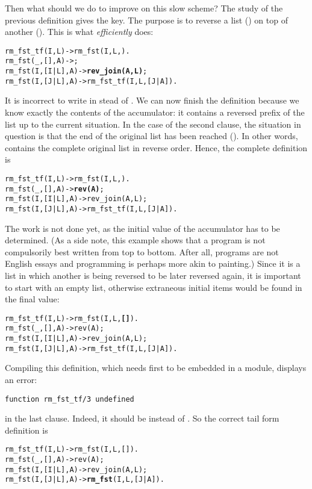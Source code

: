 Then what should we do to improve on this slow scheme? The study of
the previous definition gives the key. The purpose is to reverse a
list () on top of another (). This is what
 \emph{efficiently} does:
\begin{alltt}
rm_fst_tf(I,L)    -> rm_fst(I,L,\fbcode{[]}).
rm_fst(_,   [],A) -> \fbox{[]};
rm_fst(I,[I|L],A) -> \textbf{rev_join(A,L)};
rm_fst(I,[J|L],A) -> rm_fst_tf(I,L,[J|A]).
\end{alltt}
It is incorrect to write  in stead of
. We can now finish the definition because we
know exactly the contents of the accumulator: it contains a reversed
prefix of the list up to the current situation. In the case of the
second clause, the situation in question is that the end of the
original list has been reached (\erlcode{[]}). In other words,
 contains the complete original list in reverse
order. Hence, the complete definition is
\begin{alltt}
rm_fst_tf(I,L)    -> rm_fst(I,L,\fbcode{[]}).
rm_fst(_,   [],A) -> \textbf{rev(A)};
rm_fst(I,[I|L],A) -> rev_join(A,L);
rm_fst(I,[J|L],A) -> rm_fst_tf(I,L,[J|A]).
\end{alltt}
The work is not done yet, as the initial value of the accumulator has
to be determined. (As a side note, this example shows that a program
is not compulsorily best written from top to bottom. After all,
programs are not English essays and programming is perhaps more akin
to painting.) Since it is a list in which another is being reversed to
be later reversed again, it is important to start with an empty list,
otherwise extraneous initial items would be found in the final value:
\begin{alltt}
rm_fst_tf(I,L)    -> rm_fst(I,L,\textbf{[]}).
rm_fst(_,   [],A) -> rev(A);
rm_fst(I,[I|L],A) -> rev_join(A,L);
rm_fst(I,[J|L],A) -> rm_fst_tf(I,L,[J|A]).
\end{alltt}
Compiling this definition, which needs first to be embedded in a
module, displays an error:
\begin{center}
\texttt{function rm\_fst\_tf/3 undefined}
\end{center}
in the last clause. Indeed, it should be 
instead of . So the correct tail form definition
is\label{code:rm_fst_tf}
\begin{alltt}
rm_fst_tf(I,L)    -> rm_fst(I,L,[]).
rm_fst(_,   [],A) -> rev(A);
rm_fst(I,[I|L],A) -> rev_join(A,L);
rm_fst(I,[J|L],A) -> \textbf{rm_fst}(I,L,[J|A]).\hfill% \emph{Fixed}
\end{alltt}
